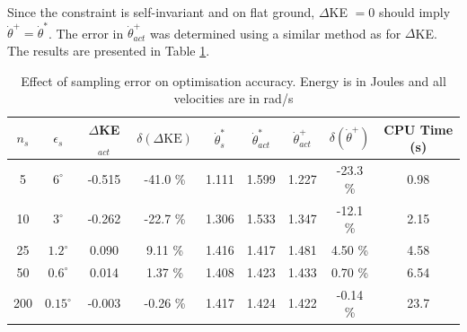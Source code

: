 Since the constraint is self-invariant and on flat ground, $\Delta$KE $=0$ should imply $\dot{\theta}^+=\dot{\theta}^*$. The error in $\dot{\theta}^+_{act}$ was determined using a similar method as for $\Delta$KE. The results are presented in Table \ref{tab:samplingerror}.

\begin{table}
	\centering
	\begin{tabular}{ c | c || c | c || c | c | c  | c || c }
		$n_s$ & $\epsilon_s$ & $\Delta$KE$_{act}$ & $\delta(\Delta\mathrm{KE})$ & $\dot{\theta}^*_s$ & $\dot{\theta}^*_{act}$ & $\dot{\theta}^+_{act}$ & $\delta(\dot{\theta}^+)$ & CPU Time (s) \\ \hline
		5   & $6^\circ$    & -0.515 & -41.0 \% & 1.111 & 1.599 & 1.227 & -23.3 \% & 0.98 \\
		10  & $3^\circ$    & -0.262 & -22.7 \% & 1.306 & 1.533 & 1.347 & -12.1 \% & 2.15 \\
		25  & $1.2^\circ$  & 0.090  & 9.11 \%  & 1.416 & 1.417 & 1.481 & 4.50 \%  & 4.58 \\
		50  & $0.6^\circ$  & 0.014  & 1.37 \%  & 1.408 & 1.423 & 1.433 & 0.70 \%  & 6.54 \\
		200 & $0.15^\circ$ & -0.003 & -0.26 \% & 1.417 & 1.424 & 1.422 & -0.14 \% & 23.7
	\end{tabular}
	\caption[Effect of sampling error on optimisation accuracy]{Effect of sampling error on optimisation accuracy. Energy is in Joules and all velocities are in rad/s}
	\label{tab:samplingerror}
\end{table}


